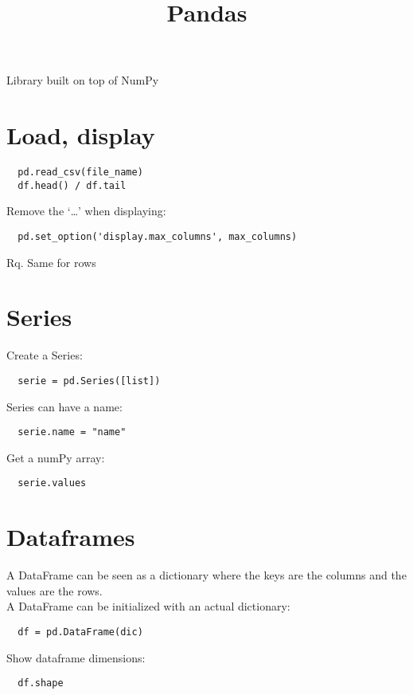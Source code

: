 \documentclass[french]{article}
\title{Pandas}
\begin{document}
\date{}

\maketitle

\setlength{\parindent}{0cm}

Library built on top of NumPy

\section{Load, display}

\begin{lstlisting}
  pd.read_csv(file_name)
  df.head() / df.tail
\end{lstlisting}

Remove the `\ldots' when displaying:
\begin{lstlisting}
  pd.set_option('display.max_columns', max_columns)
\end{lstlisting}
Rq. Same for rows

\section{Series}
Create a Series:
\begin{lstlisting}
  serie = pd.Series([list])
\end{lstlisting}

Series can have a name:
\begin{lstlisting}
  serie.name = "name"
\end{lstlisting}

Get a numPy array:
\begin{lstlisting}
  serie.values
\end{lstlisting}

\section{Dataframes}

A DataFrame can be seen as a dictionary where the keys are the columns and the values are the rows.\\
A DataFrame can be initialized with an actual dictionary:
\begin{lstlisting}
  df = pd.DataFrame(dic)
\end{lstlisting}

Show dataframe dimensions:
\begin{lstlisting}
  df.shape
\end{lstlisting}
\end{document}
